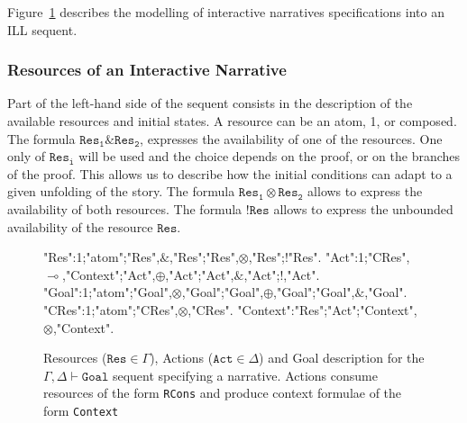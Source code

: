\documentclass[runningheads,a4paper]{llncs}
\begin{document}
Figure~\ref{fig:sequent_grammars} describes the modelling of interactive narratives specifications into an ILL sequent.
%
\subsubsection{Resources of an Interactive Narrative}
Part of the left-hand side of the sequent consists in the description of the available resources and initial states. A resource can be an atom, 1, or composed. The formula $\mathtt{Res_{1}}\&\mathtt{Res_{2}}$, expresses the availability of one of the resources. One only of $\mathtt{Res_{i}}$ will be used and the choice depends on the proof, or on the branches of the proof. This allows us to describe how the initial conditions can adapt to a given unfolding of the story. The formula $\mathtt{Res_{1}} \otimes \mathtt{Res_{2}}$ allows to express the availability of both resources. The formula $!\mathtt{Res}$ allows to express the unbounded availability of the resource $\mathtt{Res}$.
\begin{figure}
\begin{grammar}
"Res":1;"atom";"Res",$\&$,"Res";"Res",$\otimes$,"Res";!"Res".
"Act":1;"CRes",$\multimap$,"Context";"Act",$\oplus$,"Act";"Act",$\&$,"Act";!,"Act".
"Goal":1;"atom";"Goal",$\otimes$,"Goal";"Goal",$\oplus$,"Goal";"Goal",$\&$,"Goal".\\
"CRes":1;"atom";"CRes",$\otimes$,"CRes".
"Context":"Res";"Act";"Context",$\otimes$,"Context".
\end{grammar}
%
\caption{Resources ($\mathtt{Res}\in\Gamma$), Actions ($\mathtt{Act}\in\Delta$) and Goal description for the $\Gamma, \Delta \vdash \mathtt{Goal}$ sequent specifying a narrative. Actions consume resources of the form \texttt{RCons} and produce context formulae of the form \texttt{Context}\label{fig:sequent_grammars}}
\end{figure}
\end{document}
